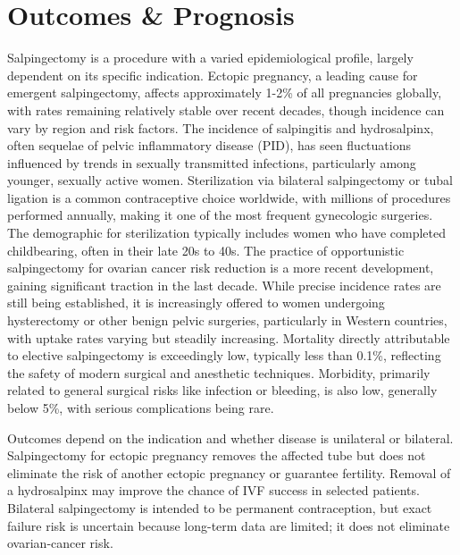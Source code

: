 \section*{Outcomes \& Prognosis}
Salpingectomy is a procedure with a varied epidemiological profile, largely dependent on its specific indication. Ectopic pregnancy, a leading cause for emergent salpingectomy, affects approximately 1-2\% of all pregnancies globally, with rates remaining relatively stable over recent decades, though incidence can vary by region and risk factors. The incidence of salpingitis and hydrosalpinx, often sequelae of pelvic inflammatory disease (PID), has seen fluctuations influenced by trends in sexually transmitted infections, particularly among younger, sexually active women. Sterilization via bilateral salpingectomy or tubal ligation is a common contraceptive choice worldwide, with millions of procedures performed annually, making it one of the most frequent gynecologic surgeries. The demographic for sterilization typically includes women who have completed childbearing, often in their late 20s to 40s. The practice of opportunistic salpingectomy for ovarian cancer risk reduction is a more recent development, gaining significant traction in the last decade. While precise incidence rates are still being established, it is increasingly offered to women undergoing hysterectomy or other benign pelvic surgeries, particularly in Western countries, with uptake rates varying but steadily increasing. Mortality directly attributable to elective salpingectomy is exceedingly low, typically less than 0.1\%, reflecting the safety of modern surgical and anesthetic techniques. Morbidity, primarily related to general surgical risks like infection or bleeding, is also low, generally below 5\%, with serious complications being rare.

Outcomes depend on the indication and whether disease is unilateral or bilateral. Salpingectomy for ectopic pregnancy removes the affected tube but does not eliminate the risk of another ectopic pregnancy or guarantee fertility. Removal of a hydrosalpinx may improve the chance of IVF success in selected patients. Bilateral salpingectomy is intended to be permanent contraception, but exact failure risk is uncertain because long-term data are limited; it does not eliminate ovarian-cancer risk.

